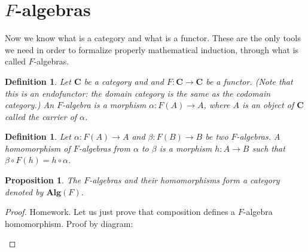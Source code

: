 \documentclass[11pt,a4paper]{article}
\newtheorem{defi}[theo]{Definition}
\newtheorem{prop}[theo]{Proposition}
\newcommand{\gr}{\textbf}
\newcommand{\1}{\mathbbm{1}}
\begin{document}
\section{$F$-algebras}
Now we know what is a category and what is a functor. These are the only tools we need in order to formalize properly mathematical induction, through what is called $F$-algebras.
\begin{defi}
Let $\gr{C}$ be a category and and $F : \gr{C} \to \gr{C}$ be a functor. (Note that this is an endofunctor: the domain category is the same as the codomain category.) An $F$-algebra is a morphism $\alpha : F(A) \to A$, where $A$ is an object of $\gr{C}$ called the carrier of $\alpha$.
\end{defi}
\begin{defi} Let $\alpha : F(A) \to A$ and $\beta : F(B) \to B$ be two $F$-algebras. A homomorphism of $F$-algebras from $\alpha$ to $\beta$ is a morphism $h : A \to B$ such that $\beta \circ F(h) = h \circ \alpha$.
\end{defi}
\begin{center}
\end{center}
\begin{prop}
The $F$-algebras and their homomorphisms form a category denoted by $\gr{Alg}(F)$.
\end{prop}
\begin{proof}[Proof] Homework. Let us just prove that composition defines a $F$-algebra homomorphism. Proof by diagram:
\begin{center}
\end{center}
\end{proof}
\end{document}
